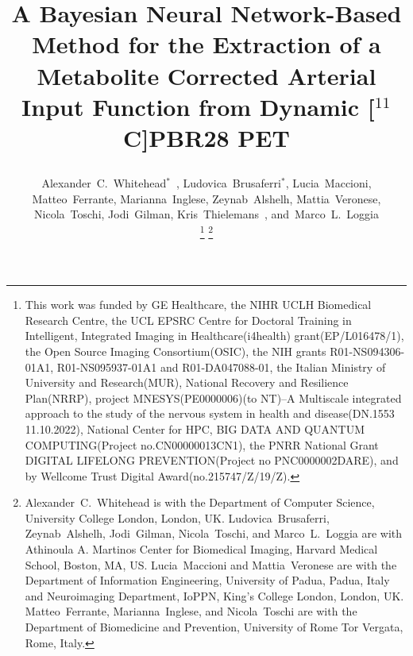 \documentclass{IEEEtran}
\begin{document}
    \title{
        \vspace{-0.75cm}
        
        A Bayesian Neural Network-Based Method for the Extraction of a Metabolite Corrected Arterial Input Function from Dynamic [$^{11}$C]PBR28 PET 
    }
    
    \author{
        \vspace{-0.25cm}
        
        Alexander~C.~Whitehead$^{*}$~,
        Ludovica~Brusaferri$^{*}$,
        Lucia~Maccioni,
        Matteo~Ferrante,
        Marianna~Inglese,
        Zeynab~Alshelh,
        Mattia~Veronese,
        Nicola~Toschi,
        Jodi~Gilman,
        Kris~Thielemans~,
        and~Marco~L.~Loggia
    
        \vspace{-0.75cm}
    
        \thanks{
            \scriptsize
            This work was funded by GE Healthcare, the NIHR UCLH Biomedical Research Centre, the UCL EPSRC Centre for Doctoral Training in Intelligent, Integrated Imaging in Healthcare(i4health) grant(EP/L016478/1), the Open Source Imaging Consortium(OSIC), the NIH grants R01-NS094306-01A1, R01-NS095937-01A1 and R01-DA047088-01, the Italian Ministry of University and Research(MUR), National Recovery and Resilience Plan(NRRP), project MNESYS(PE0000006)(to NT)–A Multiscale integrated approach to the study of the nervous system in health and disease(DN.1553 11.10.2022), National Center for HPC, BIG DATA AND QUANTUM COMPUTING(Project no.CN00000013CN1), the PNRR National Grant DIGITAL LIFELONG PREVENTION(Project no PNC0000002DARE), and by Wellcome Trust Digital Award(no.215747/Z/19/Z).
        }
        \thanks{
            \scriptsize
            Alexander~C.~Whitehead is with the Department of Computer Science, University College London, London, UK. Ludovica~Brusaferri, Zeynab~Alshelh, Jodi~Gilman, Nicola~Toschi, and Marco~L.~Loggia are with Athinoula A. Martinos Center for Biomedical Imaging, Harvard Medical School, Boston, MA, US. Lucia~Maccioni and Mattia~Veronese are with the Department of Information Engineering, University of Padua, Padua, Italy and Neuroimaging Department, IoPPN, King’s College London, London, UK. Matteo~Ferrante, Marianna~Inglese, and Nicola~Toschi are with the Department of Biomedicine and Prevention, University of Rome Tor Vergata, Rome, Italy.
        }
    }
    
    \pagestyle{plain}
    
\end{document}
